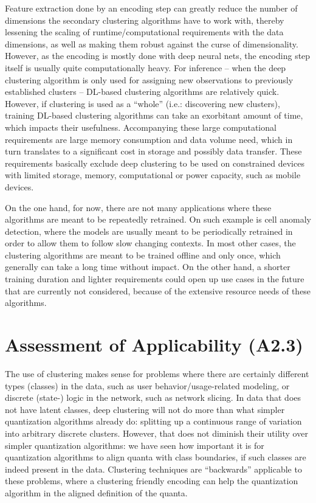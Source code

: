 		Feature extraction done by an encoding step can greatly reduce the number of dimensions the secondary clustering algorithms have to work with, thereby lessening the scaling of runtime/computational requirements with the data dimensions, as well as making them robust against the curse of dimensionality.
		However, as the encoding is mostly done with deep neural nets, the encoding step itself is usually quite computationally heavy.
		For inference -- when the deep clustering algorithm is only used for assigning new observations to previously established clusters -- \ac{DL}-based clustering algorithms are relatively quick.
		However, if clustering is used as a ``whole'' (i.e.: discovering new clusters), training \ac{DL}-based clustering algorithms can take an exorbitant amount of time, which impacts their usefulness.
		Accompanying these large computational requirements are large memory consumption and data volume need, which in turn translates to a significant cost in storage and possibly data transfer.
		These requirements basically exclude deep clustering to be used on constrained devices with limited storage, memory, computational or power capacity, such as mobile devices.
		
		On the one hand, for now, there are not many applications where these algorithms are meant to be repeatedly retrained.
		On such example is cell anomaly detection, where the models are usually meant to be periodically retrained in order to allow them to follow slow changing contexts.
		In most other cases, the clustering algorithms are meant to be trained offline and only once, which generally can take a long time without impact.
		On the other hand, a shorter training duration and lighter requirements could open up use cases in the future that are currently not considered, because of the extensive resource needs of these algorithms.
				
	\section{Assessment of Applicability (A2.3)}
	
		The use of clustering makes sense for problems where there are certainly different types (classes) in the data, such as user behavior/usage-related modeling, or discrete (state-) logic in the network, such as network slicing.
		In data that does not have latent classes, deep clustering will not do more than what simpler quantization algorithms already do: splitting up a continuous range of variation into arbitrary discrete clusters.
		However, that does not diminish their utility over simpler quantization algorithms: we have seen how important it is for quantization algorithms to align quanta with class boundaries, if such classes are indeed present in the data.	
		Clustering techniques are ``backwards'' applicable to these problems, where a clustering friendly encoding can help the quantization algorithm in the aligned definition of the quanta.
		

